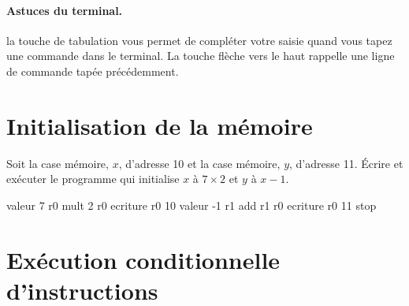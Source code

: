 \paragraph{Astuces du terminal.}
la touche de tabulation vous permet de compléter votre saisie quand
vous tapez une commande dans le terminal. La touche flèche vers le
haut rappelle une ligne de commande tapée précédemment. 

\section{Initialisation de la mémoire}

Soit la case mémoire, $x$, d'adresse 10 et la case mémoire, $y$,
d'adresse 11. Écrire et exécuter le programme qui initialise $x$ à $7
\times 2$ et $y$ à $x - 1$. 

\begin{correction}
\begin{listing}{1}
valeur 7 r0
mult 2 r0   
ecriture r0 10
valeur -1 r1
add r1 r0
ecriture r0 11
stop
\end{listing}
\end{correction}

\section{Exécution conditionnelle d'instructions}


